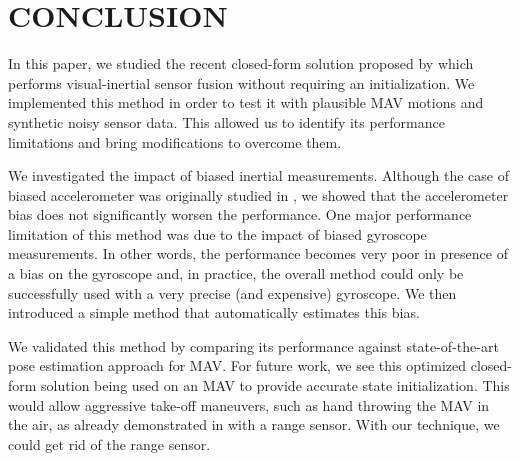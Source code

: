 \documentclass[letterpaper, 10pt, conference, final]{ieeeconf}  %
\begin{document}


\section{CONCLUSION}\label{SectionConclusion}


In this paper, we studied the recent closed-form solution proposed by \cite{Martinelli2014} which performs visual-inertial sensor fusion without requiring an initialization.
We implemented this method in order to test it with plausible MAV motions and synthetic noisy sensor data.
This allowed us to identify its performance limitations and bring modifications to overcome them.

We investigated the impact of biased inertial measurements.
Although the case of biased accelerometer was originally studied in \cite{Martinelli2014}, we showed that the accelerometer bias does not significantly worsen the performance.
One major performance limitation of this method was due to the impact of biased gyroscope measurements.
In other words, the performance becomes very poor in presence of a bias on the gyroscope and, in practice, the overall method could only be successfully used with a very precise (and expensive) gyroscope.
We then introduced a simple method that automatically estimates this bias.

We validated this method by comparing its performance against state-of-the-art pose estimation approach for MAV.
For future work, we see this optimized closed-form solution being used on an MAV to provide accurate state initialization.
This would allow aggressive take-off maneuvers, such as hand throwing the MAV in the air, as already demonstrated in \cite{Faessler2015} with a range sensor.
With our technique, we could get rid of the range sensor.


\balance
\printbibliography
\end{document}
